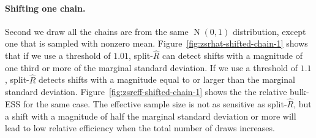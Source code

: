 \documentclass[american,]{article}
\let\oldparagraph\paragraph
\renewcommand{\paragraph}[1]{\oldparagraph{#1}\mbox{}}
\DeclareMathOperator{\N}{N}
\theoremstyle{definition}
\begin{document}
\hypertarget{shifting-one-chain}{%
\paragraph{Shifting one chain.}\label{shifting-one-chain}}
Second  we draw all the chains are from the same $\N(0, 1)$ distribution,
except one that is sampled with nonzero
mean. Figure~\ref{fig:zsrhat-shifted-chain-1} shows that if we use a
threshold of \(1.01\), split-\(\widehat{R}\) can detect shifts with a
magnitude of one third or more of the marginal standard deviation. If
we use a threshold of \(1.1\), split-\(\widehat{R}\) detects shifts
with a magnitude equal to or larger than the marginal standard
deviation.
%
Figure~\ref{fig:zsreff-shifted-chain-1} shows the the relative
bulk-ESS for the same case. The effective
sample size is not as sensitive as split-\(\widehat{R}\), but a shift
with a magnitude of half the marginal standard deviation or more will
lead to low relative efficiency when the total number of draws
increases.
\end{document}
